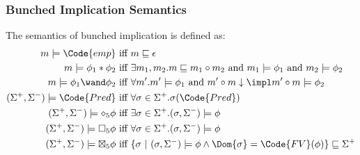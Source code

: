 \begin{frame}[fragile]
    \frametitle{Bunched Implication Semantics}

\begin{definition}
    The semantics of bunched implication is defined as:
    \begin{align*}
    m \models \Code{emp} &\text{ iff } m \sqsubseteq \epsilon
    \\m \models \phi_1 * \phi_2 &\text{ iff } \exists m_1, m_2. m \sqsubseteq m_1 \circ m_2 \text{ and } m_1 \models \phi_1 \text{ and } m_2 \models \phi_2
    \\m \models \phi_1 \wand \phi_2 &\text{ iff } \forall m'. m' \models \phi_1 \text{ and } \compable{m'}{m} \impl m' \circ m \models \phi_2
    \\(\Sigma^+, \Sigma^-) \models \Code{Pred} &\text{ iff } \forall \sigma \in \Sigma^+. \sigma(\Code{Pred})
    \\(\Sigma^+, \Sigma^-) \models \diamond_5 \phi &\text{ iff } \exists \sigma \in \Sigma^+. (\sigma, \Sigma^-) \models \phi
    \\(\Sigma^+, \Sigma^-) \models \Box_5 \phi &\text{ iff } \forall \sigma \in \Sigma^+. (\sigma, \Sigma^-) \models \phi
    \\(\Sigma^+, \Sigma^-) \models \boxtimes_5 \phi &\text{ iff } \{\sigma ~|~ (\sigma, \Sigma^-) \models \phi \land \Dom{\sigma} = \Code{FV}(\phi) \} \sqsubseteq \Sigma^+
    \end{align*}\noindent
\end{definition}

\end{frame}

